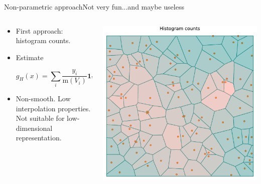\documentclass[aspectratio=169]{beamer}
\begin{document}
\begin{frame}{Non-parametric approach}{Not very fun...and maybe useless}
	
	\begin{columns}
		\begin{column}{0.5\textwidth}
			\begin{itemize}
				\item First approach: \alert{histogram counts}.
				\vspace{0.5cm}
				\item Estimate
				
				 \begin{equation*}
					g_H(x) = \sum_{i} \frac{y_i}{\mathrm{m}(V_i)} \mathbf{1}_{V_i}(x)
				 \end{equation*}
				\vspace{0.5cm}
				\item Non-smooth. Low interpolation properties. Not suitable for low-dimensional representation.
			\end{itemize}
		\end{column}
		\begin{column}{0.5\textwidth}
			\centering
			\includegraphics[width=0.9\columnwidth]{figuras/histogram_counts.pdf}
		\end{column}
	\end{columns}


\end{frame}
\end{document}
